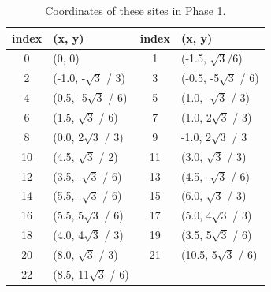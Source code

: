 \documentclass[aps,prb,reprint,amsfonts,amsmath,amssymb,showpacs,groupedaddress,superscriptaddress,onecolumn]{revtex4-1}
\begin{document}
\begin{table}[h]
    \centering
    \begin{tabular}{c | l | c | l}
        \hline
        index & (x, y) & index & (x, y) \\
        \hline
        0 & (0, 0) & 1 & (-1.5, $\sqrt{3} / 6$) \\
        \hline
        2 & (-1.0, -$\sqrt{3}$ / 3) & 3 & (-0.5, -5$\sqrt{3}$ / 6) \\
        \hline
        4 & (0.5, -5$\sqrt{3}$ / 6) & 5 & (1.0, -$\sqrt{3}$ / 3) \\
        \hline
        6 & (1.5, $\sqrt{3}$ / 6) & 7 & (1.0, 2$\sqrt{3}$ / 3) \\
        \hline
        8 & (0.0, 2$\sqrt{3}$ / 3) & 9 & -1.0, 2$\sqrt{3}$ / 3 \\
        \hline
        10 & (4.5, $\sqrt{3}$ / 2) & 11 & (3.0, $\sqrt{3}$ / 3) \\
        \hline
        12 & (3.5, -$\sqrt{3}$ / 6) & 13 & (4.5, -$\sqrt{3}$ / 6) \\
        \hline
        14 & (5.5, -$\sqrt{3}$ / 6) & 15 & (6.0, $\sqrt{3}$ / 3) \\
        \hline
        16 & (5.5, 5$\sqrt{3}$ / 6) & 17 & (5.0, 4$\sqrt{3}$ / 3) \\
        \hline
        18 & (4.0, 4$\sqrt{3}$ / 3) & 19 & (3.5, 5$\sqrt{3}$ / 6) \\
        \hline
        20 & (8.0, $\sqrt{3}$ / 3) & 21 & (10.5, 5$\sqrt{3}$ / 6) \\
        \hline
        22 & (8.5, 11$\sqrt{3}$ / 6) & & \\
        \hline
    \end{tabular}
    \caption{\label{tab:Coordinates}Coordinates of these sites in Phase 1.}
\end{table}



\end{document}
